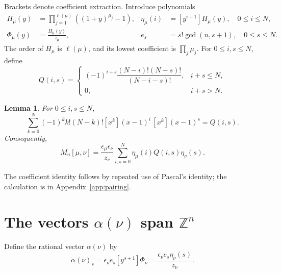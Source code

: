 \documentclass[11pt]{article}
\newtheorem{lemma}[theorem]{Lemma}
\theoremstyle{remark}
\newcommand{\Z}{\mathbb{Z}}
\begin{document}
Brackets denote coefficient extraction. Introduce polynomials
\begin{align*}
 H_\mu(y)&=\prod_{j=1}^{\ell(\mu)}((1+y)^{\mu_j}-1),&
 \eta_\mu(i)&=[y^{i+1}]H_\mu(y),\quad 0\leq i\leq N,\\
 \Phi_\mu(y)&=\frac{H_\mu(y)}{z_\mu},&
 e_s&=s!\gcd(n,s+1),\quad 0\leq s\leq N.
\end{align*}
The order of $H_\mu$ is $\ell(\mu)$, and its lowest coefficient is
$\prod_j\mu_j$. For $0\leq i,s\leq N$, define
\begin{equation}\label{eq:Q}
 Q(i,s)=\begin{cases}
 (-1)^{i+s}\dfrac{(N-i)!(N-s)!}{(N-i-s)!},&i+s\leq N,\\
 0,&i+s>N.
 \end{cases}
\end{equation}

\begin{lemma}\label{lem:pairing}
For $0\leq i,s\leq N$,
\[
 \sum_{k=0}^N(-1)^k k!(N-k)!
       [x^k](x-1)^i\,[x^k](x-1)^s=Q(i,s).
\]
Consequently,
\begin{equation}\label{eq:changed}
 M_n[\mu,\nu]=\frac{\epsilon_\mu\epsilon_\nu}{z_\nu}
        \sum_{i,s=0}^N\eta_\mu(i)Q(i,s)\eta_\nu(s).
\end{equation}
\end{lemma}
The coefficient identity follows by repeated use of Pascal's identity;
the calculation is in Appendix~\ref{app:pairing}.

\section{\texorpdfstring{The vectors $\alpha(\nu)$ span $\Z^n$}{The vectors alpha(nu) span Z\^n}}\label{sec:alpha}
Define the rational vector $\alpha(\nu)$ by
\[
 \alpha(\nu)_s=\epsilon_\nu e_s[y^{s+1}]\Phi_\nu
       =\frac{\epsilon_\nu e_s\eta_\nu(s)}{z_\nu}.
\]
\end{document}
